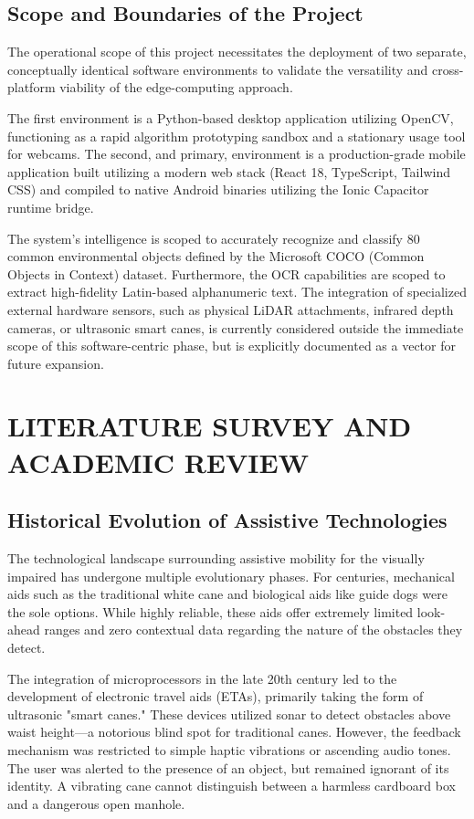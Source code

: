 \documentclass[12pt, a4paper]{report}
\begin{document}
\section{Scope and Boundaries of the Project}
The operational scope of this project necessitates the deployment of two separate, conceptually identical software environments to validate the versatility and cross-platform viability of the edge-computing approach. 

The first environment is a Python-based desktop application utilizing OpenCV, functioning as a rapid algorithm prototyping sandbox and a stationary usage tool for webcams. The second, and primary, environment is a production-grade mobile application built utilizing a modern web stack (React 18, TypeScript, Tailwind CSS) and compiled to native Android binaries utilizing the Ionic Capacitor runtime bridge. 

The system's intelligence is scoped to accurately recognize and classify 80 common environmental objects defined by the Microsoft COCO (Common Objects in Context) dataset. Furthermore, the OCR capabilities are scoped to extract high-fidelity Latin-based alphanumeric text. The integration of specialized external hardware sensors, such as physical LiDAR attachments, infrared depth cameras, or ultrasonic smart canes, is currently considered outside the immediate scope of this software-centric phase, but is explicitly documented as a vector for future expansion.

\chapter{LITERATURE SURVEY AND ACADEMIC REVIEW}

\section{Historical Evolution of Assistive Technologies}
The technological landscape surrounding assistive mobility for the visually impaired has undergone multiple evolutionary phases. For centuries, mechanical aids such as the traditional white cane and biological aids like guide dogs were the sole options. While highly reliable, these aids offer extremely limited look-ahead ranges and zero contextual data regarding the nature of the obstacles they detect.

The integration of microprocessors in the late 20th century led to the development of electronic travel aids (ETAs), primarily taking the form of ultrasonic "smart canes." These devices utilized sonar to detect obstacles above waist height—a notorious blind spot for traditional canes. However, the feedback mechanism was restricted to simple haptic vibrations or ascending audio tones. The user was alerted to the presence of an object, but remained ignorant of its identity. A vibrating cane cannot distinguish between a harmless cardboard box and a dangerous open manhole.
\end{document}
